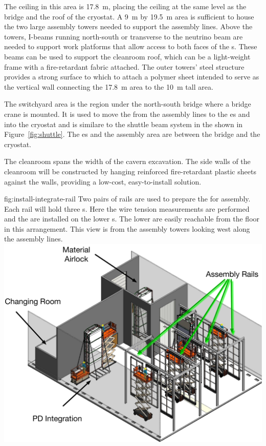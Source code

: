The ceiling in this area is \SI{17.8}{m}, placing the ceiling at the same level as the bridge and the roof of the cryostat. 
A \SI{9}{m} by \SI{19.5}{m} area is sufficient to house the two large assembly towers needed to support the assembly lines. 
Above the towers, I-beams running north-south or transverse to the neutrino beam are needed to support work platforms that allow access to both faces of the s. 
These beams can be used to support the cleanroom roof, which can be a light-weight frame with a fire-retardant fabric attached. 
The outer towers' steel structure provides a strong surface to which to attach a polymer sheet intended to serve as the vertical wall connecting the \SI{17.8}{m} area to the \SI{10}{m} tall area.

The switchyard area is the region under the north-south bridge where a bridge crane is mounted. It is used to move the  from the assembly lines to the \coldbox{}es and into the cryostat and is similare to the shuttle beam system in the  shown in Figure~\ref{fig:shuttle}. The \coldbox{}es and the  assembly area are between the bridge and the cryostat.


The cleanroom spans the width of the cavern excavation. The side walls of the cleanroom will be constructed by hanging reinforced fire-retardant plastic sheets against the walls, providing a low-cost, easy-to-install solution. 


\begin{dunefigure}{fig:install-integrate-rail}
  {Two pairs of rails are used to prepare the  for assembly. Each rail will hold three s. Here the wire tension measurements are performed and the   are installed on the lower s. The lower  are easily reachable from the floor in this arrangement. This view is from the assembly towers looking west along the assembly lines.}
\includegraphics[width=.8\textwidth]{graphics/install-integrate-rail.pdf}
\end{dunefigure}


